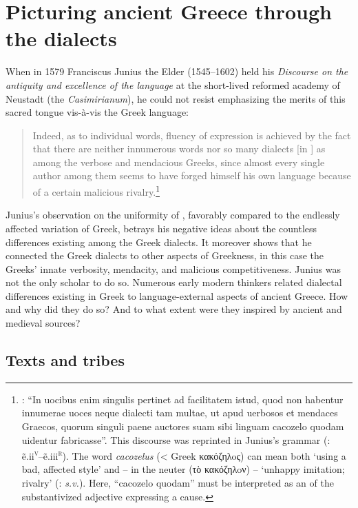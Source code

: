 \chapter{Picturing ancient Greece through the dialects}\label{chap:7}\largerpage

When in 1579 Franciscus Junius the Elder (1545–1602) held his \textit{Discourse on the antiquity and excellence of the  language} at the short-lived reformed academy of Neustadt (the \textit{Casimirianum}), he could not resist emphasizing the merits of this sacred tongue vis-à-vis the Greek language:

\begin{quote}
Indeed, as to individual words, fluency of expression is achieved by the fact that there are neither innumerous words nor so many dialects [in ] as among the verbose and mendacious Greeks, since almost every single author among them seems to have forged himself his own language because of a certain malicious rivalry.\footnote{\citet[\textsc{b.3}\textsc{\textsuperscript{v}}]{Junius1579}: “In uocibus enim singulis pertinet ad facilitatem istud, quod non habentur innumerae uoces neque dialecti tam multae, ut apud uerbosos et mendaces Graecos, quorum singuli paene auctores suam sibi linguam cacozelo quodam uidentur fabricasse”. This discourse was reprinted in Junius’s  grammar (\citealt{Junius1580}: ẽ.ii\textsc{\textsuperscript{v}}–ẽ.iii\textsc{\textsuperscript{r}}). The word \textit{cacozelus} (< Greek κακόζηλoς) can mean both ‘using a bad, affected style’ and – in the neuter (τὸ κακόζηλoν) – ‘unhappy imitation; rivalry’ (\citealt{LiddellScott1940}: \textit{s.v.}). Here, “cacozelo quodam” must be interpreted as an  of the substantivized adjective expressing a cause.}
\end{quote}

Junius’s observation on the uniformity of , favorably compared to the endlessly affected variation of Greek, betrays his negative ideas about the countless differences existing among the Greek dialects. It moreover shows that he connected the Greek dialects to other aspects of Greekness, in this case the Greeks’ innate verbosity, mendacity, and malicious competitiveness. Junius was not the only scholar to do so. Numerous early modern thinkers related dialectal differences existing in Greek to language-external aspects of ancient Greece. How and why did they do so? And to what extent were they inspired by ancient and medieval sources?

\section{Texts and tribes}\label{sec:7.1}

